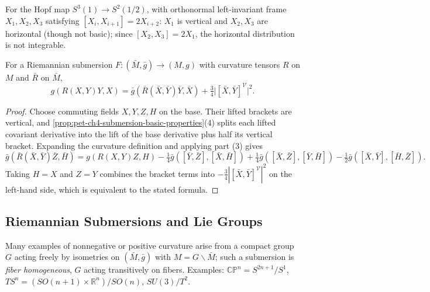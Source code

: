 \begin{example}
  \label{ex:pet-ch4-hopf-integrability}
  For the Hopf map $S^3(1)\to S^2(1/2)$, with orthonormal left-invariant frame
  $X_1,X_2,X_3$ satisfying $[X_i,X_{i+1}]=2X_{i+2}$: $X_1$ is vertical and
  $X_2,X_3$ are horizontal (though not basic); since $[X_2,X_3]=2X_1$, the
  horizontal distribution is not integrable.
\end{example}

\begin{theorem}
  \label{thm:pet-ch4-oneill-formula}
  For a Riemannian submersion $F:(\bar M,\bar g)\to(M,g)$ with curvature
  tensors $R$ on $M$ and $\bar R$ on $\bar M$,
  \[
    g(R(X,Y)Y,X)=\bar g(\bar R(\bar X,\bar Y)\bar Y,\bar X)+\tfrac34\big|[\bar X,\bar Y]^{\mathcal V}\big|^2.
  \]
\end{theorem}
\begin{proof}
  \sketch
  Choose commuting fields $X,Y,Z,H$ on the base. Their lifted brackets are
  vertical, and \cref{prop:pet-ch4-submersion-basic-properties}(4) splits each
  lifted covariant derivative into the lift of the base derivative plus half
  its vertical bracket. Expanding the curvature definition and applying part
  (3) gives
  \[
    \bar g(\bar R(\bar X,\bar Y)\bar Z,\bar H)=g(R(X,Y)Z,H)
    -\tfrac14\bar g([\bar Y,\bar Z],[\bar X,\bar H])
    +\tfrac14\bar g([\bar X,\bar Z],[\bar Y,\bar H])
    -\tfrac12\bar g([\bar X,\bar Y],[\bar H,\bar Z]).
  \]
  Taking $H=X$ and $Z=Y$ combines the bracket terms into
  $-\tfrac34|[\bar X,\bar Y]^{\mathcal V}|^2$ on the left-hand side, which is
  equivalent to the stated formula.
\end{proof}


\subsection{Riemannian Submersions and Lie Groups}

\begin{remark}
  \label{rem:pet-ch4-fiber-homogeneous-submersions}
  Many examples of nonnegative or positive curvature arise from a compact
  group $G$ acting freely by isometries on $(\bar M,\bar g)$ with
  $M=G\backslash\bar M$; such a submersion is \emph{fiber homogeneous}, $G$
  acting transitively on fibers. Examples: $\mathbb{CP}^n=S^{2n+1}/S^1$,
  $TS^n=(SO(n+1)\times\mathbb{R}^n)/SO(n)$, $SU(3)/T^2$.
\end{remark}

